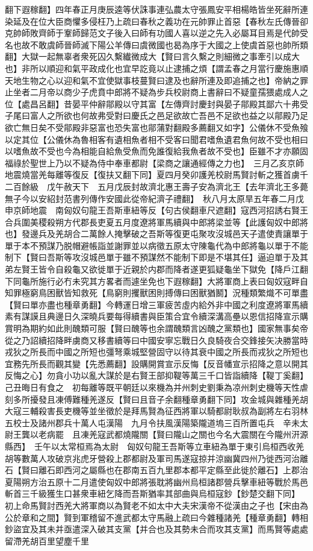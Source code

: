 翻下遐稼翻】四年春正月庚辰逵等伏誅事連弘農太守張鳳安平相楊皓皆坐死辭所連染延及在位大臣商懼多侵枉乃上疏曰春秋之義功在元帥罪止首惡【春秋左氏傳晉卻克帥師敗齊師于鞌師歸范文子後入曰師有功國人喜以逆之先入必屬耳目焉是代帥受名也故不敢虞師晉師滅下陽公羊傳曰虞微國也曷為序于大國之上使虞首惡也帥所類翻】大獄一起無辜者衆死囚久繫纎微成大【賢曰言久繫之則細微之事牽引以成大也】非所以順迎和氣平政成化也宜早訖竟以止逮捕之煩【謂孟春之月當行慶施惠順天地生物之心以迎和氣不宜使獄事枝蔓賢曰逮及也辭所連及即追捕之也】帝納之罪止坐者二月帝以商少子虎賁中郎將不疑為步兵校尉商上書辭曰不疑童孺猥處成人之位【處昌呂翻】昔晏平仲辭鄁殿以守其富【左傳齊討慶封與晏子鄁殿其鄙六十弗受子尾曰富人之所欲也何故弗受對曰慶氏之邑足欲故亡吾邑不足欲也益之以鄁殿乃足欲亡無日矣不受鄁殿非惡富也恐失富也鄁蒲對翻殿多薦翻又如字】公儀休不受魚飱以定其位【公儀休為魯相客有遺相魚者相不受客曰聞君嗜魚遺君魚何故不受也相曰以嗜魚故不受也今為相能自給魚受魚而免誰復給我魚者故不受也】臣雖不才亦願固福祿於聖世上乃以不疑為侍中奉車都尉【梁商之讓通經傳之力也】　三月乙亥京師地震燒當羌每離等復反【復扶又翻下同】夏四月癸卯護羌校尉馬賢討斬之獲首虜千二百餘級　戊午赦天下　五月戊辰封故濟北惠王壽子安為濟北王【去年濟北王多薨無子今以安紹封范書列傳作安國此從帝紀濟子禮翻】　秋八月太原旱五年春二月戊申京師地震　南匈奴句龍王吾斯車紐等反【句古侯翻車尺遮翻】寇西河招誘右賢王合兵圍美稷殺朔方代郡長吏夏五月度遼將軍馬續與中郎將梁並等【此護匈奴中郎將也】發邊兵及羌胡合二萬餘人掩擊破之吾斯等復更屯聚攻沒城邑天子遣使責讓單于單于本不預謀乃脱帽避帳詣並謝罪並以病徵五原太守陳龜代為中郎將龜以單于不能制下【賢曰吾斯等攻沒城邑單于雖不預謀然不能制下即是不堪其任】逼迫單于及其弟左賢王皆令自殺龜又欲徙單于近親於内郡而降者遂更狐疑龜坐下獄免【降戶江翻下同龜所施行必冇未究其方畧者而遽坐免也下遐稼翻】大將軍商上表曰匈奴寇畔自知罪極窮鳥困獸皆知救死【鳥窮則攫獸困則搏傳曰困獸猶鬭】況種類繁熾不可單盡【賢曰單亦盡也種章勇翻】今轉運日增三軍疲苦虛内給外非中國之利度遼將軍馬續素有謀謨且典邊日久深曉兵要每得續書與臣策合宜令續深溝高壘以恩信招降宣示購賞明為期約如此則醜類可服【賢曰醜等也余謂醜類言凶醜之黨類也】國家無事矣帝從之乃詔續招降畔虜商又移書續等曰中國安寧忘戰日久良騎夜合交鋒接矢决勝當時戎狄之所長而中國之所短也彊弩乘城堅營固守以待其衰中國之所長而戎狄之所短也宜務先所長而觀其變【先悉薦翻】設購開賞宣示反悔【反音幡宣示招降之意以開其反悔之心】勿貪小功以亂大謀於是右賢王部抑鞮等萬三千口皆詣續降【鞮丁奚翻】　己丑晦日有食之　初每離等既平朝廷以來機為并州刺史劉秉為凉州刺史機等天性虐刻多所擾發且凍傅難種羌遂反【賢曰且音子余翻種章勇翻下同】攻金城與雜種羌胡大寇三輔殺害長吏機等並坐徵於是拜馬賢為征西將軍以騎都尉耿叔為副將左右羽林五校士及諸州郡兵十萬人屯漢陽　九月令扶風漢陽築隴道塢三百所置屯兵　辛未太尉王龔以老病罷　且凍羌寇武都燒隴關【賢曰隴山之關也今名大震關在今隴州汧源縣西】　壬午以太常桓焉為太尉　匈奴句龍王吾斯等立車紐為單于東引烏桓西收羌胡等數萬人攻破京兆虎牙營殺上郡都尉及軍司馬遂寇掠并涼幽冀四州乃徙西河治離石【賢曰離石即西河之屬縣也在郡南五百九里郡本都平定縣至此徙於離石】上郡治夏陽朔方治五原十二月遣使匈奴中郎將張耽將幽州烏桓諸郡營兵擊車紐等戰於馬邑斬首三千級獲生口甚衆車紐乞降而吾斯猶率其部曲與烏桓寇鈔【鈔楚交翻下同】　初上命馬賢討西羌大將軍商以為賢老不如太中大夫宋漢帝不從漢由之子也【宋由為公於章和之間】賢到軍稽留不進武都太守馬融上疏曰今雜種諸羌【種章勇翻】轉相鈔盜宜及其未并亟遣深入破其支黨【并合也及其勢未合而攻其支黨】而馬賢等處處留滯羌胡百里望塵千里